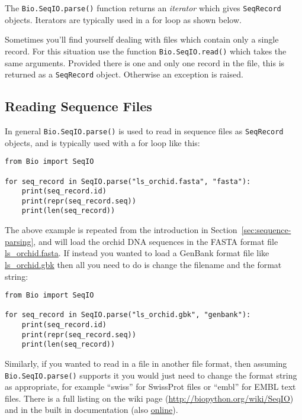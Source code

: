 The \verb|Bio.SeqIO.parse()| function returns an \textit{iterator} which gives \verb|SeqRecord| objects.  Iterators are typically used in a for loop as shown below.

Sometimes you'll find yourself dealing with files which contain only a single record.  For this situation use the function \verb|Bio.SeqIO.read()| which takes the same arguments.  Provided there is one and only one record in the file, this is returned as a \verb|SeqRecord| object.  Otherwise an exception is raised.

\subsection{Reading Sequence Files}

In general \verb|Bio.SeqIO.parse()| is used to read in sequence files as \verb|SeqRecord| objects, and is typically used with a for loop like this:

\begin{verbatim}
from Bio import SeqIO

for seq_record in SeqIO.parse("ls_orchid.fasta", "fasta"):
    print(seq_record.id)
    print(repr(seq_record.seq))
    print(len(seq_record))
\end{verbatim}

The above example is repeated from the introduction in Section~\ref{sec:sequence-parsing}, and will load the orchid DNA sequences in the FASTA format file \href{https://raw.githubusercontent.com/biopython/biopython/master/Doc/examples/ls_orchid.fasta}{ls\_orchid.fasta}.  If instead you wanted to load a GenBank format file like \href{https://raw.githubusercontent.com/biopython/biopython/master/Doc/examples/ls_orchid.gbk}{ls\_orchid.gbk} then all you need to do is change the filename and the format string:

\begin{verbatim}
from Bio import SeqIO

for seq_record in SeqIO.parse("ls_orchid.gbk", "genbank"):
    print(seq_record.id)
    print(repr(seq_record.seq))
    print(len(seq_record))
\end{verbatim}

Similarly, if you wanted to read in a file in another file format, then assuming \verb|Bio.SeqIO.parse()| supports it you would just need to change the format string as appropriate, for example ``swiss'' for SwissProt files or ``embl'' for EMBL text files. There is a full listing on the wiki page (\url{http://biopython.org/wiki/SeqIO}) and in the built in documentation (also \href{http://biopython.org/docs/\bpversion/api/Bio.SeqIO.html}{online}).

